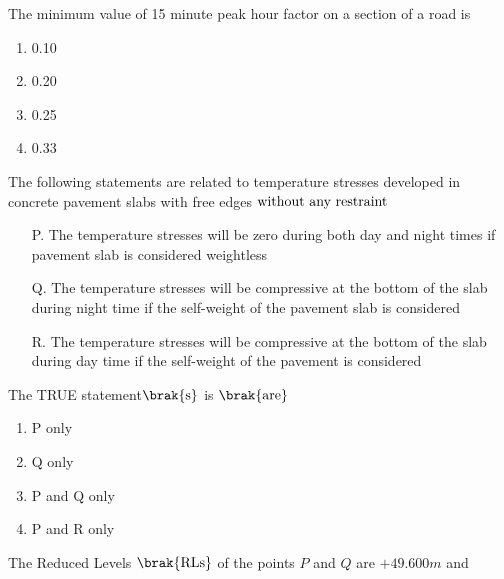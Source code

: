     \item[23.] The minimum value of 15 minute peak hour factor on a section of a road is
        \hfill{}
        \begin{multicols}{4}

            \begin{enumerate}
                \item  0.10 \columnbreak
                \item  0.20 \columnbreak
                \item  0.25  \columnbreak
                \item  0.33
            \end{enumerate}
        \end{multicols}
    \item[24.] The following statements are related to temperature stresses developed in concrete 
        pavement slabs with free edges $\textnormal{without any restraint}$
        \begin{enumerate}
            \item[P.] The temperature stresses will be zero during both day and night times if
                pavement slab is considered weightless
            \item[Q.] The temperature stresses will be compressive at the bottom of the slab during night
                time if the self-weight of the pavement slab is considered
            \item[R.] The temperature stresses will be compressive at the bottom of the slab during day time
                if the self-weight of the pavement is considered 
        \end{enumerate}
        The TRUE statement$\brak{\textnormal{s}}$ is $\brak{\textnormal{are}}$ 
        \hfill{}
        \begin{multicols}{4}
            \begin{enumerate}
                \item  P only \columnbreak
                \item  Q only \columnbreak
                \item  P and Q only  \columnbreak
                \item  P and R only
            \end{enumerate}
        \end{multicols}  
    \item[25.] The Reduced Levels $\brak{\textnormal{RLs}}$ of the points $P$ and $Q$ are $+49.600m$ and 
